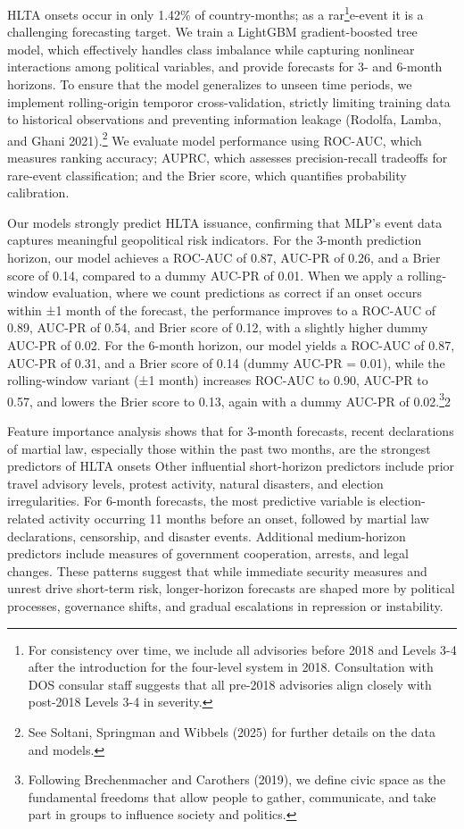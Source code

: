 \documentclass[
  letterpaper,
  DIV=11,
  numbers=noendperiod]{scrartcl}
\begin{document}
HLTA onsets occur in only 1.42\% of country-months; as a
rar\footnote{For consistency over time, we include all advisories before
  2018 and Levels 3-4 after the introduction for the four-level system
  in 2018. Consultation with DOS consular staff suggests that all
  pre-2018 advisories align closely with post-2018 Levels 3-4 in
  severity.}e-event it is a challenging forecasting target. We train a
LightGBM gradient-boosted tree model, which effectively handles class
imbalance while capturing nonlinear interactions among political
variables, and provide forecasts for 3- and 6-month horizons. To ensure
that the model generalizes to unseen time periods, we implement
rolling-origin temporor cross-validation, strictly limiting training
data to historical observations and preventing information leakage
(Rodolfa, Lamba, and Ghani 2021).\footnote{See Soltani, Springman and
  Wibbels (2025) for further details on the data and models.} We
evaluate model performance using ROC-AUC, which measures ranking
accuracy; AUPRC, which assesses precision-recall tradeoffs for
rare-event classification; and the Brier score, which quantifies
probability calibration.

Our models strongly predict HLTA issuance, confirming that MLP's event
data captures meaningful geopolitical risk indicators. For the 3-month
prediction horizon, our model achieves a ROC-AUC of 0.87, AUC-PR of
0.26, and a Brier score of 0.14, compared to a dummy AUC-PR of 0.01.
When we apply a rolling-window evaluation, where we count predictions as
correct if an onset occurs within ±1 month of the forecast, the
performance improves to a ROC-AUC of 0.89, AUC-PR of 0.54, and Brier
score of 0.12, with a slightly higher dummy AUC-PR of 0.02. For the
6-month horizon, our model yields a ROC-AUC of 0.87, AUC-PR of 0.31, and
a Brier score of 0.14 (dummy AUC-PR = 0.01), while the rolling-window
variant (±1 month) increases ROC-AUC to 0.90, AUC-PR to 0.57, and lowers
the Brier score to 0.13, again with a dummy AUC-PR of 0.02.\footnote{Following
  Brechenmacher and Carothers (2019), we define civic space as the
  fundamental freedoms that allow people to gather, communicate, and
  take part in groups to influence society and politics.}2

Feature importance analysis shows that for 3-month forecasts, recent
declarations of martial law, especially those within the past two
months, are the strongest predictors of HLTA onsets Other influential
short-horizon predictors include prior travel advisory levels, protest
activity, natural disasters, and election irregularities. For 6-month
forecasts, the most predictive variable is election-related activity
occurring 11 months before an onset, followed by martial law
declarations, censorship, and disaster events. Additional medium-horizon
predictors include measures of government cooperation, arrests, and
legal changes. These patterns suggest that while immediate security
measures and unrest drive short-term risk, longer-horizon forecasts are
shaped more by political processes, governance shifts, and gradual
escalations in repression or instability.
\end{document}

